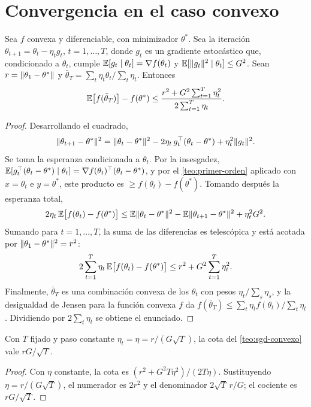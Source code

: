 \section{Convergencia en el caso convexo}

\begin{teorema}\label{teo:sgd-convexo}
Sea $f$ convexa y diferenciable, con minimizador $\theta^{\ast}$. Sea la iteración $\theta_{t+1}=\theta_t-\eta_t g_t$, $t=1,\dots,T$, donde $g_t$ es un gradiente estocástico que, condicionado a $\theta_t$, cumple $\mathbb{E}[g_t\mid\theta_t]=\nabla f(\theta_t)$ y $\mathbb{E}[\lVert g_t\rVert^{2}\mid\theta_t]\le G^{2}$. Sean $r=\lVert\theta_1-\theta^{\ast}\rVert$ y $\bar\theta_T=\sum_t\eta_t\theta_t/\sum_t\eta_t$. Entonces
\[
\mathbb{E}\bigl[f(\bar\theta_T)\bigr]-f(\theta^{\ast})\le\frac{r^{2}+G^{2}\sum_{t=1}^{T}\eta_t^{2}}{2\sum_{t=1}^{T}\eta_t}.
\]
\end{teorema}

\begin{proof}
Desarrollando el cuadrado,
\[
\lVert\theta_{t+1}-\theta^{\ast}\rVert^{2}=\lVert\theta_t-\theta^{\ast}\rVert^{2}-2\eta_t\,g_t^{\top}(\theta_t-\theta^{\ast})+\eta_t^{2}\lVert g_t\rVert^{2}.
\]
Se toma la esperanza condicionada a $\theta_t$. Por la insesgadez, $\mathbb{E}[g_t^{\top}(\theta_t-\theta^{\ast})\mid\theta_t]=\nabla f(\theta_t)^{\top}(\theta_t-\theta^{\ast})$, y por el \cref{teo:primer-orden} aplicado con $x=\theta_t$ e $y=\theta^{\ast}$, este producto es $\ge f(\theta_t)-f(\theta^{\ast})$. Tomando después la esperanza total,
\[
2\eta_t\,\mathbb{E}\bigl[f(\theta_t)-f(\theta^{\ast})\bigr]\le\mathbb{E}\lVert\theta_t-\theta^{\ast}\rVert^{2}-\mathbb{E}\lVert\theta_{t+1}-\theta^{\ast}\rVert^{2}+\eta_t^{2}G^{2}.
\]
Sumando para $t=1,\dots,T$, la suma de las diferencias es telescópica y está acotada por $\lVert\theta_1-\theta^{\ast}\rVert^{2}=r^{2}$:
\[
2\sum_{t=1}^{T}\eta_t\,\mathbb{E}\bigl[f(\theta_t)-f(\theta^{\ast})\bigr]\le r^{2}+G^{2}\sum_{t=1}^{T}\eta_t^{2}.
\]
Finalmente, $\bar\theta_T$ es una combinación convexa de los $\theta_t$ con pesos $\eta_t/\sum_s\eta_s$, y la desigualdad de Jensen para la función convexa $f$ da $f(\bar\theta_T)\le\sum_t\eta_t f(\theta_t)/\sum_t\eta_t$. Dividiendo por $2\sum_t\eta_t$ se obtiene el enunciado.
\end{proof}

\begin{corolario}\label{cor:sgd-constante}
Con $T$ fijado y paso constante $\eta_t=\eta=r/(G\sqrt T)$, la cota del \cref{teo:sgd-convexo} vale $rG/\sqrt T$.
\end{corolario}

\begin{proof}
Con $\eta$ constante, la cota es $(r^{2}+G^{2}T\eta^{2})/(2T\eta)$. Sustituyendo $\eta=r/(G\sqrt T)$, el numerador es $2r^{2}$ y el denominador $2\sqrt T\,r/G$; el cociente es $rG/\sqrt T$.
\end{proof}

